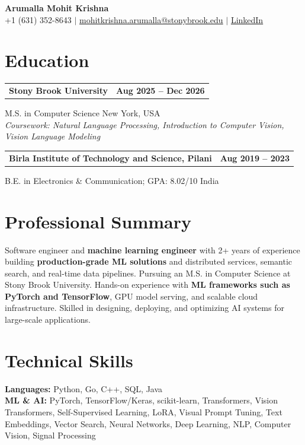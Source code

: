 \documentclass[letterpaper,10pt]{article}
\makeatletter
\newcommand{\entry}[2]{%
  \noindent
  \begin{tabularx}{\linewidth}
    {@{}>{\raggedright\arraybackslash}X@{\hspace{6pt}}r@{}}
    \textbf{#1} & #2
  \end{tabularx}\par
}
\makeatother
\begin{document}
\begin{center}
    {\LARGE\bfseries Arumalla Mohit Krishna}\\[3pt]
    +1 (631) 352-8643 $|$
    \href{mailto:mohitkrishna.arumalla@stonybrook.edu}
    {mohitkrishna.arumalla@stonybrook.edu} $|$
    \href{https://linkedin.com/in/mohit-krishna-arumalla}
    {LinkedIn}
\end{center}
\vspace{-8pt}

\section{Education}

\entry
  {\textbf{Stony Brook University}}
  {\textbf{Aug 2025 -- Dec 2026}}

M.S. in Computer Science \hfill New York, USA\\
\textit{
Coursework: Natural Language Processing,
Introduction to Computer Vision, Vision Language Modeling
}
\vspace{3pt}

\entry
  {\textbf{Birla Institute of Technology and Science, Pilani}}
  {\textbf{Aug 2019 -- 2023}}

B.E. in Electronics \& Communication; GPA: 8.02/10 \hfill India
\section{Professional Summary}

Software engineer and \textbf{machine learning engineer} with 2+ years of experience building \textbf{production-grade ML solutions} and distributed services,
semantic search, and real-time data pipelines. Pursuing an M.S. in Computer
Science at Stony Brook University. Hands-on experience with \textbf{ML frameworks such as PyTorch and TensorFlow}, GPU model serving, and scalable cloud infrastructure. Skilled in designing, deploying, and optimizing AI systems for large-scale applications.
\section{Technical Skills}

\textbf{Languages:}
Python, Go, C++, SQL, Java\\

\textbf{ML \& AI:}
PyTorch, TensorFlow/Keras, scikit-learn, Transformers,
Vision Transformers, Self-Supervised Learning, LoRA, Visual Prompt Tuning,
Text Embeddings, Vector Search, Neural Networks,
Deep Learning, NLP, Computer Vision, Signal Processing\\
\end{document}
